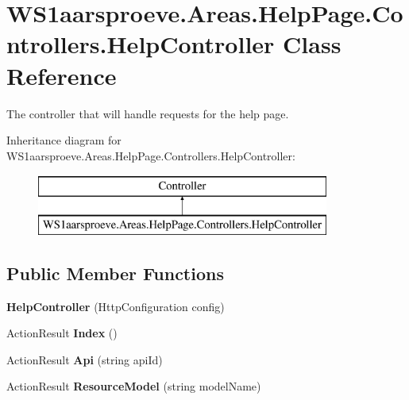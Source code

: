 \hypertarget{class_w_s1aarsproeve_1_1_areas_1_1_help_page_1_1_controllers_1_1_help_controller}{}\section{W\+S1aarsproeve.\+Areas.\+Help\+Page.\+Controllers.\+Help\+Controller Class Reference}
\label{class_w_s1aarsproeve_1_1_areas_1_1_help_page_1_1_controllers_1_1_help_controller}


The controller that will handle requests for the help page.  


Inheritance diagram for W\+S1aarsproeve.\+Areas.\+Help\+Page.\+Controllers.\+Help\+Controller\+:\begin{figure}[H]
\begin{center}
\leavevmode
\includegraphics[height=2.000000cm]{class_w_s1aarsproeve_1_1_areas_1_1_help_page_1_1_controllers_1_1_help_controller}
\end{center}
\end{figure}
\subsection*{Public Member Functions}
\begin{DoxyCompactItemize}
\item 
\hypertarget{class_w_s1aarsproeve_1_1_areas_1_1_help_page_1_1_controllers_1_1_help_controller_a1e5fef2ae84c90a23b4751f3c1bd54cc}{}{\bfseries Help\+Controller} (Http\+Configuration config)\label{class_w_s1aarsproeve_1_1_areas_1_1_help_page_1_1_controllers_1_1_help_controller_a1e5fef2ae84c90a23b4751f3c1bd54cc}

\item 
\hypertarget{class_w_s1aarsproeve_1_1_areas_1_1_help_page_1_1_controllers_1_1_help_controller_a36177bd3bea04ea645601ba789c81f4d}{}Action\+Result {\bfseries Index} ()\label{class_w_s1aarsproeve_1_1_areas_1_1_help_page_1_1_controllers_1_1_help_controller_a36177bd3bea04ea645601ba789c81f4d}

\item 
\hypertarget{class_w_s1aarsproeve_1_1_areas_1_1_help_page_1_1_controllers_1_1_help_controller_aaa766b1d1e1d737faba2d707be97de05}{}Action\+Result {\bfseries Api} (string api\+Id)\label{class_w_s1aarsproeve_1_1_areas_1_1_help_page_1_1_controllers_1_1_help_controller_aaa766b1d1e1d737faba2d707be97de05}

\item 
\hypertarget{class_w_s1aarsproeve_1_1_areas_1_1_help_page_1_1_controllers_1_1_help_controller_ad0816892041880bd4caefd7aa2e306d0}{}Action\+Result {\bfseries Resource\+Model} (string model\+Name)\label{class_w_s1aarsproeve_1_1_areas_1_1_help_page_1_1_controllers_1_1_help_controller_ad0816892041880bd4caefd7aa2e306d0}

\end{DoxyCompactItemize}
